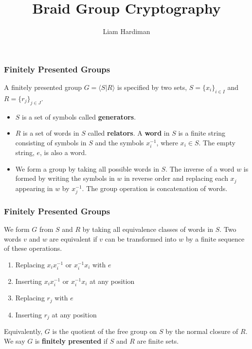 \documentclass{beamer}
\title{Braid Group Cryptography}
\author{Liam Hardiman}
\begin{document}
\maketitle

\begin{frame}
	\frametitle{Finitely Presented Groups}
	A finitely presented group $G=\langle S | R\rangle$ is specified by two sets, $S = \{x_i\}_{i\in I}$ and $R = \{r_j\}_{j\in J}$.\pause
	\begin{itemize}
		\item $S$ is a set of symbols called \textbf{generators}.\pause
		\item $R$ is a set of words in $S$ called \textbf{relators}. A \textbf{word} in $S$ is a finite string consisting of symbols in $S$ and the symbols $x_i^{-1}$, where $x_i\in S$. The empty string, $e$, is also a word.\pause
		\item We form a group by taking all possible words in $S$. The inverse of a word $w$ is formed by writing the symbols in $w$ in reverse order and replacing each $x_j$ appearing in $w$ by $x_j^{-1}$. The group operation is concatenation of words.
	\end{itemize}
\end{frame}

\begin{frame}
	\frametitle{Finitely Presented Groups}
	We form $G$ from $S$ and $R$ by taking all equivalence classes of words in $S$. Two words $v$ and $w$ are equivalent if $v$ can be transformed into $w$ by a finite sequence of these operations.\pause
	\begin{enumerate}
		\item Replacing $x_ix_i^{-1}$ or $x_i^{-1}x_i$ with $e$\pause
		\item Inserting $x_ix_i^{-1}$ or $x_i^{-1}x_i$ at any position\pause
		\item Replacing $r_j$ with $e$\pause
		\item Inserting $r_j$ at any position\pause
	\end{enumerate}
	Equivalently, $G$ is the quotient of the free group on $S$ by the normal closure of $R$. We say $G$ is \textbf{finitely presented} if $S$ and $R$ are finite sets.
\end{frame}
\end{document}

